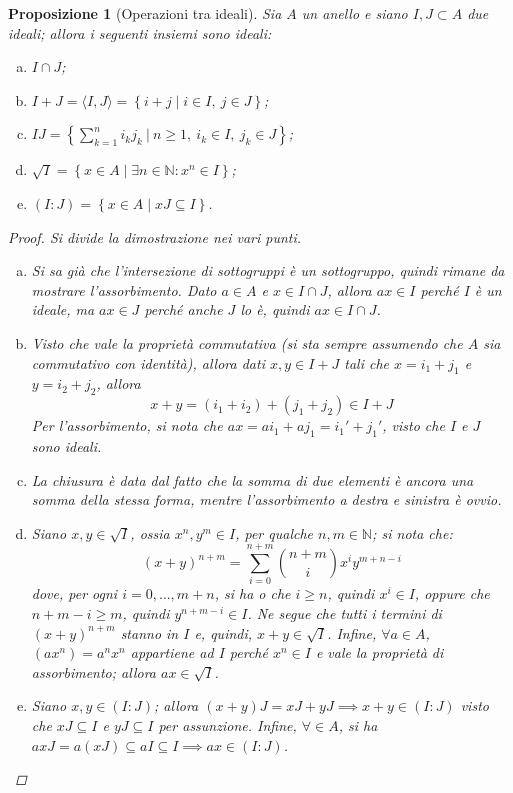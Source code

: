 \documentclass[12pt]{scrartcl}
\theoremstyle{style}
\newtheorem{prop}{Proposizione}[section]
\numberwithin{equation}{subsection}
\begin{document}
\begin{prop}
	[Operazioni tra ideali]
	Sia $A$ un anello e siano $I,J \subset A$ due ideali; allora i seguenti insiemi sono ideali:
	\begin{enumerate}[(a).]
		\item $I\cap J$;
		\item $I+J = \langle I,J \rangle = \left\{ i + j  \mid i \in I, \ j \in J \right\} $;
		\item $IJ = \left\{ \sum_{k=1}^{n} i_k j_k\ \Big\lvert\ n\ge 1,\ i_k \in I, \ j_k \in J \right\} $;
		\item $\sqrt{I} = \left\{ x \in A  \mid \exists n \in \mathbb{N} : x^n \in I \right\} $;
		\item $(I:J) = \left\{ x \in A  \mid  xJ \subseteq I \right\} $.
	\end{enumerate}
	\begin{proof}
		Si divide la dimostrazione nei vari punti.
		\begin{enumerate}[(a).]
			\item Si sa gi\`a che l'intersezione di sottogruppi \`e un sottogruppo, quindi rimane da mostrare l'assorbimento.
				Dato $a \in A$ e $x \in I \cap J$, allora $ax \in I$ perch\'e $I$ \`e un ideale, ma $ax \in J$ perch\'e anche $J$ lo \`e, quindi $ax \in I \cap J$.
			\item Visto che vale la propriet\`a commutativa (si sta sempre assumendo che $A$ sia commutativo con identit\`a), allora dati $x, y \in I+J$ tali che $x = i_1 + j_1$ e $y = i_2+j_2$, allora
				\[
				x + y = (i_1+i_2)+(j_1+j_2) \in I+J
				\] 
				Per l'assorbimento, si nota che $ax = ai_1 + aj_1 = i_1' + j_1'$, visto che $I$ e $J$ sono ideali.
			\item La chiusura \`e data dal fatto che la somma di due elementi \`e ancora una somma della stessa forma, mentre l'assorbimento a destra e sinistra \`e ovvio.
			\item Siano $x,y \in \sqrt{I} $, ossia $x^n , y ^m \in I$, per qualche $n,m\in \mathbb{N}$; si nota che:
				\[
					(x+y)^{n+m} = \sum_{i=0}^{n+m} \binom{n+m}{i} x^i y^{m+n - i}
				\] 
				dove, per ogni $i= 0,\ldots,m+n$, si ha o che $i\ge n$, quindi $x^i \in I$, oppure che $n+m -i \ge m$, quindi $y^{n+m-i } \in I$.
				Ne segue che tutti i termini di $(x+y)^{n+m} $ stanno in $I$ e, quindi, $x+y \in \sqrt{I} $.
				Infine, $\forall  a \in A$, $(ax^n) = a^n x^n$ appartiene ad $I$ perch\'e $x^n \in I$ e vale la propriet\`a di assorbimento; allora $ax \in \sqrt{I} $.
			\item Siano $x,y \in (I:J)$; allora $(x+y) J = xJ + yJ \implies x+y \in (I:J)$ visto che $xJ \subseteq I$ e $yJ \subseteq I$ per assunzione.
				Infine, $\forall  \in A$, si ha $axJ = a(xJ) \subseteq aI \subseteq I \implies ax \in (I:J)$.
		\end{enumerate}
	\end{proof}
\end{prop}
\end{document}
